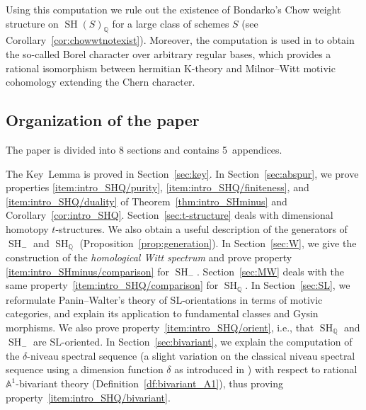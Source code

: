 \documentclass[11pt]{article}
\newcommand{\ie}{i.e.,\xspace}
\numberwithin{equation}{section}\renewcommand{\encodingdefault}{TU}
\newcommand{\tstructures}{$t$-structures\xspace}
\renewcommand{\AA}{\mathbb A}
\newcommand{\SL}{\mathrm{SL}}
\DeclareMathOperator{\SH}{SH}
\newcommand{\QQ} {\mathbb Q}
\theoremstyle{remark}
\theoremstyle{definition}
\numberwithin{equation}{thm}
\begin{document}
Using this computation we rule out the existence of Bondarko's Chow weight structure on $\SH(S)_\QQ$ for a large class of schemes $S$ (see Corollary~\ref{cor:chowwtnotexist}).
Moreover, the computation is used in \cite{DF3} to obtain
the so-called Borel character over arbitrary regular bases, which provides
a rational isomorphism between hermitian K-theory and Milnor--Witt motivic cohomology extending the Chern character.

\subsection*{Organization of the paper}

The paper is divided into 8 sections and contains 5~appendices.

The Key~Lemma is proved in Section~\ref{sec:key}.
In Section~\ref{sec:abspur}, we prove properties \eqref{item:intro_SHQ/purity}, \eqref{item:intro_SHQ/finiteness}, and \eqref{item:intro_SHQ/duality} of Theorem~\ref{thm:intro_SHminus} and Corollary~\ref{cor:intro_SHQ}.
Section~\ref{sec:t-structure} deals with dimensional homotopy \tstructures.
We also obtain a useful description of the generators of $\SH_-$ and $\SH_\QQ$ (Proposition~\ref{prop:generation}).
In Section~\ref{sec:W}, we give the construction of the \emph{homological Witt spectrum} and prove property \eqref{item:intro_SHminus/comparison} for $\SH_-$.
Section~\ref{sec:MW} deals with the same property~\eqref{item:intro_SHQ/comparison} for $\SH_\QQ$.
In Section~\ref{sec:SL}, we reformulate Panin--Walter's theory of SL-orientations in terms of motivic categories, and explain its application to fundamental classes and Gysin morphisms.
We also prove property~\eqref{item:intro_SHQ/orient}, \ie that $\SH_\QQ$ and $\SH_-$ are $\SL$-oriented.
In Section~\ref{sec:bivariant}, we explain the computation of the $\delta$-niveau spectral sequence (a slight variation on the classical niveau spectral sequence using a dimension function $\delta$
as introduced in \cite{BD1}) with respect to rational $\AA^1$-bivariant theory (Definition~\ref{df:bivariant_A1}), thus proving property~\eqref{item:intro_SHQ/bivariant}.
\end{document}
